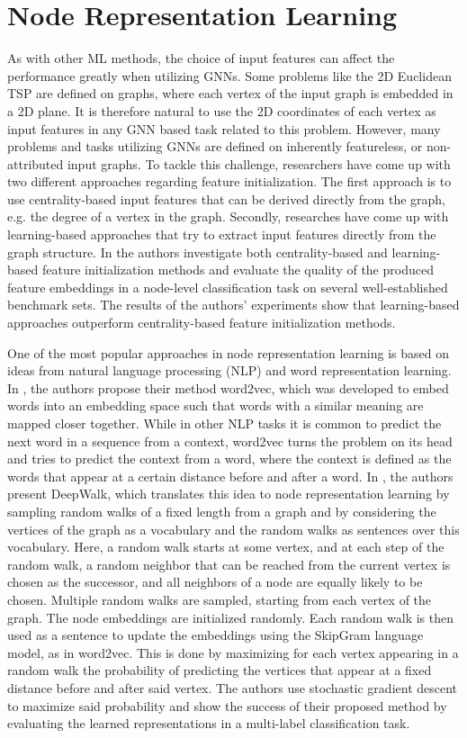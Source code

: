 \documentclass[draft,final]{vutinfth} %
\begin{document}
\section{Node Representation Learning}\label{sec:node-representation}

As with other ML methods, the choice of input features can affect the performance greatly when utilizing GNNs. 
Some problems like the 2D Euclidean TSP are defined on graphs, where each vertex of the input graph is embedded in a 2D plane. It is therefore natural to use the 2D coordinates of each vertex as input features in any GNN based task related to this problem. 
However, many problems and tasks utilizing GNNs are defined on inherently featureless, or non-attributed input graphs. 
To tackle this challenge, researchers have come up with two different approaches regarding feature initialization. The first approach is to use centrality-based input features that can be derived directly from the graph, e.g. the degree of a vertex in the graph. Secondly, researches have come up with learning-based approaches that try to extract input features directly from the graph structure. In \cite{Duong2019} the authors investigate both centrality-based and learning-based feature initialization methods and evaluate the quality of the produced feature embeddings in a node-level classification task on several well-established benchmark sets. The results of the authors' experiments show that learning-based approaches outperform centrality-based feature initialization methods. 

One of the most popular approaches in node representation learning is based on ideas from natural language processing (NLP) and word representation learning. In \cite{Mikolov2013}, the authors propose their method word2vec, which was developed to embed words into an embedding space such that words with a similar meaning are mapped closer together. While in other NLP tasks it is common to predict the next word in a sequence from a context, word2vec turns the problem on its head and tries to predict the context from a word, where the context is defined as the words that appear at a certain distance before and after a word. 
In \cite{Perozzi2014}, the authors present DeepWalk, which translates this idea to node representation learning by sampling random walks of a fixed length from a graph and by considering the vertices of the graph as a vocabulary and the random walks as sentences over this vocabulary. Here, a random walk starts at some vertex, and at each step of the random walk, a random neighbor that can be reached from the current vertex is chosen as the successor, and all neighbors of a node are equally likely to be chosen. Multiple random walks are sampled, starting from each vertex of the graph. 
The node embeddings are initialized randomly. Each random walk is then used as a sentence to update the embeddings using the SkipGram language model, as in word2vec. This is done by maximizing for each vertex appearing in a random walk the probability of predicting the vertices that appear at a fixed distance before and after said vertex. The authors use stochastic gradient descent to maximize said probability and show the success of their proposed method by evaluating the learned representations in a multi-label classification task. 
\end{document}
